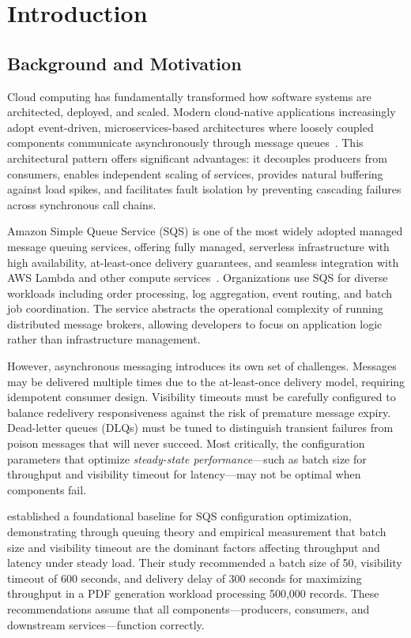 \chapter{Introduction}

\section{Background and Motivation}

Cloud computing has fundamentally transformed how software systems are architected, deployed, and scaled. Modern cloud-native applications increasingly adopt event-driven, microservices-based architectures where loosely coupled components communicate asynchronously through message queues~\citep{Thaur2023EventDrivenKafka, Laigner2024EventChallenges}. This architectural pattern offers significant advantages: it decouples producers from consumers, enables independent scaling of services, provides natural buffering against load spikes, and facilitates fault isolation by preventing cascading failures across synchronous call chains.

Amazon Simple Queue Service (SQS) is one of the most widely adopted managed message queuing services, offering fully managed, serverless infrastructure with high availability, at-least-once delivery guarantees, and seamless integration with AWS Lambda and other compute services~\citep{AWSSQSGuide}. Organizations use SQS for diverse workloads including order processing, log aggregation, event routing, and batch job coordination. The service abstracts the operational complexity of running distributed message brokers, allowing developers to focus on application logic rather than infrastructure management.

However, asynchronous messaging introduces its own set of challenges. Messages may be delivered multiple times due to the at-least-once delivery model, requiring idempotent consumer design. Visibility timeouts must be carefully configured to balance redelivery responsiveness against the risk of premature message expiry. Dead-letter queues (DLQs) must be tuned to distinguish transient failures from poison messages that will never succeed. Most critically, the configuration parameters that optimize \emph{steady-state performance}—such as batch size for throughput and visibility timeout for latency—may not be optimal when components fail.

\citet{Kyrychenko2025} established a foundational baseline for SQS configuration optimization, demonstrating through queuing theory and empirical measurement that batch size and visibility timeout are the dominant factors affecting throughput and latency under steady load. Their study recommended a batch size of 50, visibility timeout of 600 seconds, and delivery delay of 300 seconds for maximizing throughput in a PDF generation workload processing 500,000 records. These recommendations assume that all components—producers, consumers, and downstream services—function correctly.

